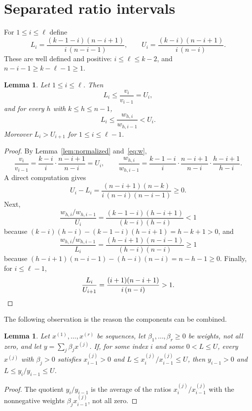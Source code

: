 \documentclass[11pt]{amsart}
\newtheorem{lemma}[theorem]{Lemma}
\theoremstyle{definition}
\theoremstyle{remark}
\numberwithin{equation}{section}
\begin{document}
\section{Separated ratio intervals}\label{sec:ratios}

For $1\le i\le\ell$ define
\begin{equation}\label{eq:LU}
L_i=\frac{(k-1-i)(n-i+1)}{i\,(n-i-1)},\qquad U_i=\frac{(k-i)(n-i+1)}{i\,(n-i)} .
\end{equation}
These are well defined and positive: $i\le\ell\le k-2$, and $n-i-1\ge k-\ell-1\ge1$.

\begin{lemma}\label{lem:ratios}
Let $1\le i\le\ell$. Then
\[
L_i\le\frac{v_i}{v_{i-1}}=U_i,
\]
and for every $h$ with $k\le h\le n-1$,
\[
L_i\le\frac{w_{h,i}}{w_{h,i-1}}<U_i .
\]
Moreover $L_i>U_{i+1}$ for $1\le i\le\ell-1$.
\end{lemma}

\begin{proof}
By Lemma~\ref{lem:normalized} and~\eqref{eq:w},
\[
\frac{v_i}{v_{i-1}}=\frac{k-i}{i}\cdot\frac{n-i+1}{n-i}=U_i,\qquad
\frac{w_{h,i}}{w_{h,i-1}}=\frac{k-1-i}{i}\cdot\frac{n-i+1}{n-i}\cdot\frac{h-i+1}{h-i}.
\]
A direct computation gives
\[
U_i-L_i=\frac{(n-i+1)(n-k)}{i\,(n-i)(n-i-1)}\ge0 .
\]
Next,
\[
\frac{w_{h,i}/w_{h,i-1}}{U_i}=\frac{(k-1-i)(h-i+1)}{(k-i)(h-i)}<1
\]
because $(k-i)(h-i)-(k-1-i)(h-i+1)=h-k+1>0$, and
\[
\frac{w_{h,i}/w_{h,i-1}}{L_i}=\frac{(h-i+1)(n-i-1)}{(h-i)(n-i)}\ge1
\]
because $(h-i+1)(n-i-1)-(h-i)(n-i)=n-h-1\ge0$. Finally, for $i\le\ell-1$,
\[
\frac{L_i}{U_{i+1}}=\frac{(i+1)(n-i+1)}{i\,(n-i)}>1 . \qedhere
\]
\end{proof}

The following observation is the reason the components can be combined.

\begin{lemma}\label{lem:mediant}
Let $x^{(1)},\dots,x^{(r)}$ be sequences, let $\beta_1,\dots,\beta_r\ge0$ be weights, not all zero, and let $y=\sum_j\beta_jx^{(j)}$. If, for some index $i$ and some $0<L\le U$, every $x^{(j)}$ with $\beta_j>0$ satisfies $x^{(j)}_{i-1}>0$ and $L\le x^{(j)}_i/x^{(j)}_{i-1}\le U$, then $y_{i-1}>0$ and $L\le y_i/y_{i-1}\le U$.
\end{lemma}

\begin{proof}
The quotient $y_i/y_{i-1}$ is the average of the ratios $x^{(j)}_i/x^{(j)}_{i-1}$ with the nonnegative weights $\beta_jx^{(j)}_{i-1}$, not all zero.
\end{proof}
\end{document}
